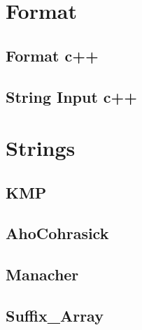 \documentclass[9pt]{extarticle}
\begin{document}
\maketitle
\begin{multicols*}{3}
\setlength{\parskip}{0.0in}
\tableofcontents
\setlength{\parskip}{0.1in}
\section{Format}

\subsection{Format c++} %

\subsection{String Input c++} %


% 



\section{Strings}

\subsection{KMP} %


\subsection{AhoCohrasick} %


\subsection{Manacher}


\subsection{Suffix\_Array} %



\end{multicols*}
\end{document}
